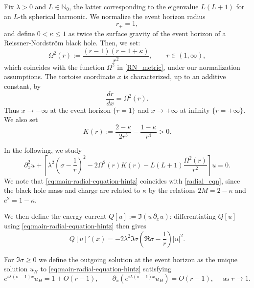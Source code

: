 \documentclass[11pt]{article}
\numberwithin{equation}{section}
\begin{document}
	Fix $\lambda>0$ and 
	$L\in\mathbb N_0$, the latter corresponding to the  eigenvalue $L(L+1)$ for an $L$-th spherical harmonic.  We normalize the event horizon
	radius $$r_+=1,$$ and define $0<\kappa\leq1$ as twice the surface gravity of the event horizon of a Reissner-Nordstr{\"o}m black hole. Then, we set:
	\begin{equation}
		\Omega^2(r)
		:=\frac{(r-1)(r-1+\kappa)}{r^2},
		\qquad r\in(1,\infty),
		\label{eq:Omega2-definition}
	\end{equation}
	which coincides with  the function $\Omega^2$ in \eqref{RN_metric}, under our normalization assumptions.
	The tortoise coordinate $x$ is characterized, up to an additive
	constant, by
	\begin{equation}
		\frac{dr}{dx}=\Omega^2(r).
		\label{eq:tortoise-Omega}
	\end{equation}
	Thus $x\to-\infty$ at the event horizon $\{r=1\}$ and $x\to+\infty$ at infinity $\{r=+\infty\}$.
	We also set
	\begin{equation}
		K(r):=\frac{2-\kappa}{2r^3}-\frac{1-\kappa}{r^4}>0.
		\label{eq:K-and-g}
	\end{equation}
	
	In the following, we study
	\begin{equation}
		\partial_x^2u+
		\left[\lambda^2\left(\sigma-\frac1r\right)^2-2\Omega^2(r)K(r)
		-L(L+1)\frac{\Omega^2(r)}{r^2}\right]u=0.
		\label{eq:main-radial-equation-hintz}
	\end{equation}
	We note that \eqref{eq:main-radial-equation-hintz} coincides with \eqref{radial_eqn}, since the black hole mass and charge are related to $\kappa$ by the relations $2M = 2- \kappa$ and $e^2 = 1 - \kappa$.
	
	We then define the energy current $Q[u]:=\Im(\overline u\,\partial_xu)$: differentiating $Q[u]$ using \eqref{eq:main-radial-equation-hintz} then gives
	\begin{equation}
		Q[u]'(x)
		=-2\lambda^2\Im\sigma
		\left(\Re\sigma-\frac1r\right)|u|^2.
		\label{energy1}
	\end{equation}
	
	
	For $\Im\sigma\geq0$ we define the outgoing solution at the event horizon as the unique solution $u_H$ to \eqref{eq:main-radial-equation-hintz} satisfying
	\begin{equation}
		e^{i\lambda(\sigma-1)x}u_H=1+O(r-1),
		\qquad
		\partial_x\!\left(e^{i\lambda(\sigma-1)x}u_H\right)=O(r-1),
		\quad \text{ as }r\to1.
		\label{eq:horizon-outgoing-definition}
	\end{equation}
	
\end{document}
